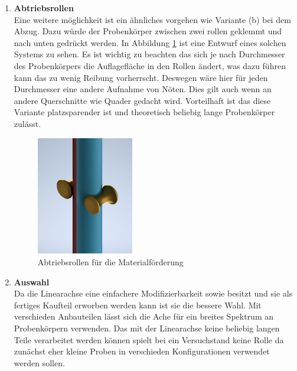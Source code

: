 \begin{enumerate}[label=(\alph*)]
    \item \textbf{Abtriebsrollen}\\
    Eine weitere möglichkeit ist ein ähnliches vorgehen wie Variante (b) bei dem Abzug. Dazu würde der Probenkörper zwischen zwei rollen geklemmt und nach unten gedrückt werden. In Abbildung \ref{fig:abtrieb_mat} ist eine Entwurf eines solchen Systems zu sehen. Es ist wichtig zu beachten das sich je nach Durchmesser des Probenkörpers die Auflagefläche in den Rollen ändert, was dazu führen kann das zu wenig Reibung vorherrscht. Deswegen wäre hier für jeden Durchmesser eine andere Aufnahme von Nöten. Dies gilt auch wenn an andere Querschnitte wie Quader gedacht wird. Vorteilhaft ist das diese Variante platzsparender ist und theoretisch beliebig lange Probenkörper zulässt.
  
    \begin{figure}[!h]
        \centering
        \includegraphics[width = 0.4\textwidth]{Abbildungen/abtrieb_mat.png}
        \caption{Abtriebsrollen für die Materialförderung}
        \label{fig:abtrieb_mat}
    \end{figure}
    
    \newpage
    
    \item \textbf{Auswahl}\\
    Da die Linearachse eine einfachere Modifizierbarkeit sowie besitzt und sie als fertiges Kaufteil erworben werden kann ist sie die bessere Wahl. Mit verschieden Anbauteilen lässt sich die Ache für ein breites Spektrum an Probenkörpern verwenden. 
    Das mit der Linearachse keine beliebig langen Teile verarbeitet werden können spielt bei ein Versuchstand keine Rolle da zunächst eher kleine Proben in verschieden Konfigurationen verwendet werden sollen. 



\end{enumerate}

